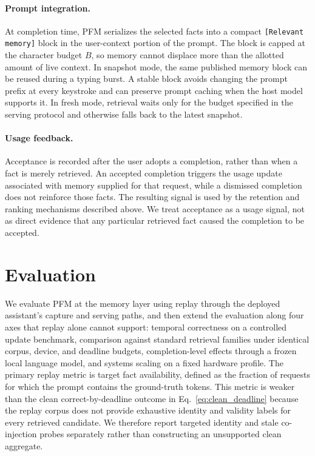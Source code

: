 \documentclass[letterpaper]{article} %
\begin{document}
\paragraph{Prompt integration.} At completion time, PFM serializes the selected facts into a compact \texttt{[Relevant memory]} block in the user-context portion of the prompt. The block is capped at the character budget $B$, so memory cannot displace more than the allotted amount of live context. In snapshot mode, the same published memory block can be reused during a typing burst. A stable block avoids changing the prompt prefix at every keystroke and can preserve prompt caching when the host model supports it. In fresh mode, retrieval waits only for the budget specified in the serving protocol and otherwise falls back to the latest snapshot.

\paragraph{Usage feedback.} Acceptance is recorded after the user adopts a completion, rather than when a fact is merely retrieved. An accepted completion triggers the usage update associated with memory supplied for that request, while a dismissed completion does not reinforce those facts. The resulting signal is used by the retention and ranking mechanisms described above. We treat acceptance as a usage signal, not as direct evidence that any particular retrieved fact caused the completion to be accepted.

\section{Evaluation}

We evaluate PFM at the memory layer using replay through the deployed assistant's capture and serving paths, and then extend the evaluation along four axes that replay alone cannot support: temporal correctness on a controlled update benchmark, comparison against standard retrieval families under identical corpus, device, and deadline budgets, completion-level effects through a frozen local language model, and systems scaling on a fixed hardware profile. The primary replay metric is target fact availability, defined as the fraction of requests for which the prompt contains the ground-truth tokens. This metric is weaker than the clean correct-by-deadline outcome in Eq.~\eqref{eq:clean_deadline} because the replay corpus does not provide exhaustive identity and validity labels for every retrieved candidate. We therefore report targeted identity and stale co-injection probes separately rather than constructing an unsupported clean aggregate.
\end{document}
